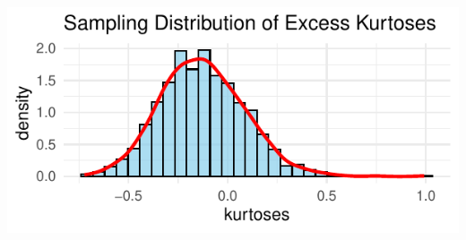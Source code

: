 \documentclass{article}\usepackage[]{graphicx}\usepackage[]{xcolor}
\makeatletter
\def\maxwidth{ %
  \ifdim\Gin@nat@width>\linewidth
    \linewidth
  \else
    \Gin@nat@width
  \fi
}
\newenvironment{knitrout}{}{} %
\makeatother
\begin{document}
\begin{knitrout}
\color{fgcolor}
\includegraphics[width=\maxwidth]{figure/unnamed-chunk-9-1} 
\end{knitrout}
\end{document}
